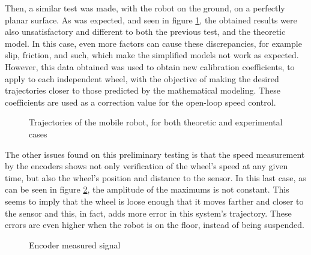 \documentclass[a4paper]{aadeca}
\makeatletter
\newenvironment{customlegend}[1][]{%
    \begingroup
    \csname pgfplots@init@cleared@structures\endcsname
    \pgfplotsset{#1}%
}{%
    \csname pgfplots@createlegend\endcsname
    \endgroup
}%
\def\addlegendimage{\csname pgfplots@addlegendimage\endcsname}
\makeatother
\begin{document}
Then, a similar test was made, with the robot on the ground, on a perfectly planar surface.
As was expected, and seen in figure \ref{fig:tray}, the obtained results were also unsatisfactory and different to both the previous test, and the theoretic model.
In this case, even more factors can cause these discrepancies, for example slip, friction, and such, which make the simplified models not work as expected.
However, this data obtained was used to obtain new calibration coefficients, to apply to each independent wheel, with the objective of making the desired trajectories closer to those predicted by the mathematical modeling.
These coefficients are used as a correction value for the open-loop speed control.

\begin{figure}[h]
\centering
\newlength\figureheight
\newlength\figurewidth
\setlength\figureheight{\columnwidth} \setlength\figurewidth{\columnwidth}
\noindent\resizebox{0.9\columnwidth}{!}{
}
\caption{Trajectories of the mobile robot, for both theoretic and experimental cases}
\label{fig:tray}
\end{figure}

The other issues found on this preliminary testing is that the speed measurement by the encoders shows not only verification of the wheel's speed at any given time, but also the wheel's position and distance to the sensor.
In this last case, as can be seen in figure \ref{fig:encoders_temporales}, the amplitude of the maximums is not constant.
This seems to imply that the wheel is loose enough that it moves farther and closer to the sensor and this, in fact, adds more error in this system's trajectory.
These errors are even higher when the robot is on the floor, instead of being suspended. 

\begin{figure}[h]
\centering
\noindent\resizebox{0.95\columnwidth}{!}{
}
\caption{Encoder measured signal}
\label{fig:encoders_temporales}
\end{figure}
\end{document}
